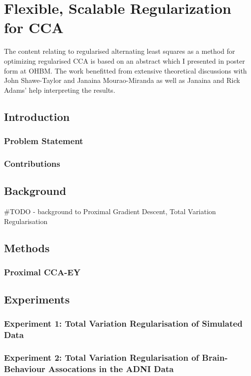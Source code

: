 \chapter{Flexible, Scalable Regularization for CCA}
\label{Regularised}
\minitoc
The content relating to regularised alternating least squares as a method for optimizing regularised CCA is based on an abstract which I presented in poster form at OHBM. The work benefitted from extensive theoretical discussions with John Shawe-Taylor and Janaina Mourao-Miranda as well as Janaina and Rick Adams' help interpreting the results.

\section{Introduction}

\subsection{Problem Statement}

\subsection{Contributions}

\section{Background}
#TODO - background to Proximal Gradient Descent, Total Variation Regularisation

\section{Methods}
\subsection{Proximal CCA-EY}



\section{Experiments}


\subsection{Experiment 1: Total Variation Regularisation of Simulated Data}

\subsection{Experiment 2: Total Variation Regularisation of Brain-Behaviour Assocations in the ADNI Data}
